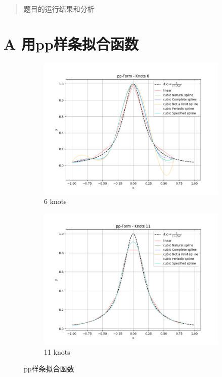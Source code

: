 \documentclass[UTF8]{ctexart}
\begin{document}
	
	\pagestyle{fancy}
	\fancyhead{}
	\rhead{\today}
	\begin{abstract}
		题目的运行结果和分析
	\end{abstract}
	\section{A 用pp样条拟合函数}
		\begin{figure}[H]
		\centering
		\begin{subfigure}[b]{0.45\textwidth}
			\centering
			\includegraphics[width=\textwidth]{../figure/A_1.png}
			\caption{6 knots}
			\label{fig:image1}
		\end{subfigure}
		\hspace{0.5cm}  %
		\begin{subfigure}[b]{0.45\textwidth}
			\centering
			\includegraphics[width=\textwidth]{../figure/A_2.png}
			\caption{11 knots}
			\label{fig:image2}
		\end{subfigure}
		\caption{pp样条拟合函数}
		\label{fig:two_images}
	\end{figure}
	
\end{document}
